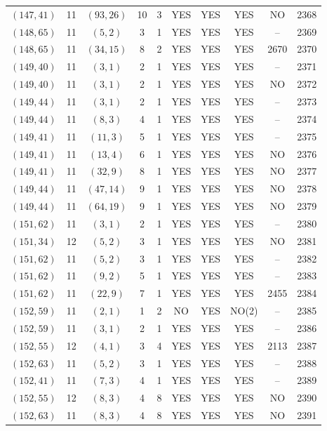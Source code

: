 \begin{longtable}{|c|c|c|c|c|c|c|c|c|c|}
$(147, 41)$ & 11 & $(93, 26)$ & 10 & 3 & YES & YES & YES & NO & 2368\\
$(148, 65)$ & 11 & $(5, 2)$ & 3 & 1 & YES & YES & YES & -- & 2369\\
$(148, 65)$ & 11 & $(34, 15)$ & 8 & 2 & YES & YES & YES & 2670 & 2370\\
$(149, 40)$ & 11 & $(3, 1)$ & 2 & 1 & YES & YES & YES & -- & 2371\\
$(149, 40)$ & 11 & $(3, 1)$ & 2 & 1 & YES & YES & YES & NO & 2372\\
$(149, 44)$ & 11 & $(3, 1)$ & 2 & 1 & YES & YES & YES & -- & 2373\\
$(149, 44)$ & 11 & $(8, 3)$ & 4 & 1 & YES & YES & YES & -- & 2374\\
$(149, 41)$ & 11 & $(11, 3)$ & 5 & 1 & YES & YES & YES & -- & 2375\\
$(149, 41)$ & 11 & $(13, 4)$ & 6 & 1 & YES & YES & YES & NO & 2376\\
$(149, 41)$ & 11 & $(32, 9)$ & 8 & 1 & YES & YES & YES & NO & 2377\\
$(149, 44)$ & 11 & $(47, 14)$ & 9 & 1 & YES & YES & YES & NO & 2378\\
$(149, 44)$ & 11 & $(64, 19)$ & 9 & 1 & YES & YES & YES & NO & 2379\\
$(151, 62)$ & 11 & $(3, 1)$ & 2 & 1 & YES & YES & YES & -- & 2380\\
$(151, 34)$ & 12 & $(5, 2)$ & 3 & 1 & YES & YES & YES & NO & 2381\\
$(151, 62)$ & 11 & $(5, 2)$ & 3 & 1 & YES & YES & YES & -- & 2382\\
$(151, 62)$ & 11 & $(9, 2)$ & 5 & 1 & YES & YES & YES & -- & 2383\\
$(151, 62)$ & 11 & $(22, 9)$ & 7 & 1 & YES & YES & YES & 2455 & 2384\\
$(152, 59)$ & 11 & $(2, 1)$ & 1 & 2 & NO & YES & NO(2) & -- & 2385\\
$(152, 59)$ & 11 & $(3, 1)$ & 2 & 1 & YES & YES & YES & -- & 2386\\
$(152, 55)$ & 12 & $(4, 1)$ & 3 & 4 & YES & YES & YES & 2113 & 2387\\
$(152, 63)$ & 11 & $(5, 2)$ & 3 & 1 & YES & YES & YES & -- & 2388\\
$(152, 41)$ & 11 & $(7, 3)$ & 4 & 1 & YES & YES & YES & -- & 2389\\
$(152, 55)$ & 12 & $(8, 3)$ & 4 & 8 & YES & YES & YES & NO & 2390\\
$(152, 63)$ & 11 & $(8, 3)$ & 4 & 8 & YES & YES & YES & NO & 2391\\

\end{longtable}
